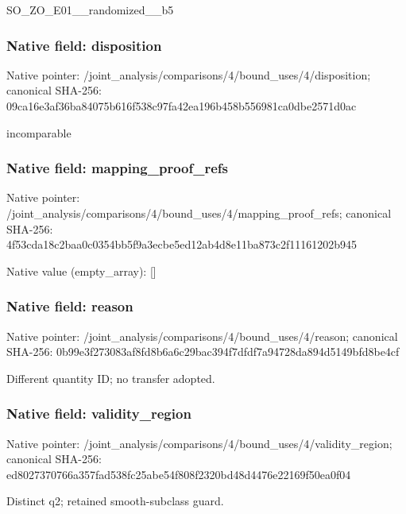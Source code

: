 \documentclass[10pt,a4paper]{article}
\begin{document}
\begingroup\raggedright\sloppy SO\_\allowbreak{}ZO\_\allowbreak{}E01\_\allowbreak{}\_\allowbreak{}randomized\_\allowbreak{}\_\allowbreak{}b5\par\endgroup

\subsubsection{Native field: disposition}
Native pointer: /joint\_\allowbreak{}analysis/comparisons/4/bound\_\allowbreak{}uses/4/disposition; canonical SHA-256: 09ca16e3af36ba84075b616f538c97fa42ea196b458b556981ca0dbe2571d0ac

\begingroup\raggedright\sloppy incomparable\par\endgroup

\subsubsection{Native field: mapping\_\allowbreak{}proof\_\allowbreak{}refs}
Native pointer: /joint\_\allowbreak{}analysis/comparisons/4/bound\_\allowbreak{}uses/4/mapping\_\allowbreak{}proof\_\allowbreak{}refs; canonical SHA-256: 4f53cda18c2baa0c0354bb5f9a3ecbe5ed12ab4d8e11ba873c2f11161202b945

Native value (empty\_\allowbreak{}array): []

\subsubsection{Native field: reason}
Native pointer: /joint\_\allowbreak{}analysis/comparisons/4/bound\_\allowbreak{}uses/4/reason; canonical SHA-256: 0b99e3f273083af8fd8b6a6c29bac394f7dfdf7a94728da894d5149bfd8be4cf

\begingroup\raggedright\sloppy Different quantity ID;\allowbreak{} no transfer adopted.\par\endgroup

\subsubsection{Native field: validity\_\allowbreak{}region}
Native pointer: /joint\_\allowbreak{}analysis/comparisons/4/bound\_\allowbreak{}uses/4/validity\_\allowbreak{}region; canonical SHA-256: ed8027370766a357fad538fc25abe54f808f2320bd48d4476e22169f50ea0f04

\begingroup\raggedright\sloppy Distinct q2;\allowbreak{} retained smooth-subclass guard.\par\endgroup
\end{document}
